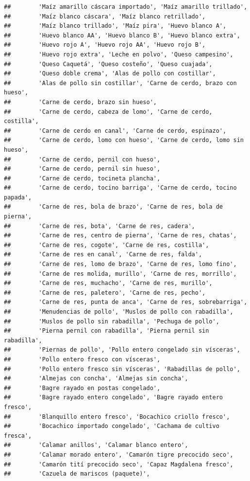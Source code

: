 \documentclass[
]{book}
\begin{document}
\begin{verbatim}
##        'Maíz amarillo cáscara importado', 'Maíz amarillo trillado',
##        'Maíz blanco cáscara', 'Maíz blanco retrillado',
##        'Maíz blanco trillado', 'Maíz pira', 'Huevo blanco A',
##        'Huevo blanco AA', 'Huevo blanco B', 'Huevo blanco extra',
##        'Huevo rojo A', 'Huevo rojo AA', 'Huevo rojo B',
##        'Huevo rojo extra', 'Leche en polvo', 'Queso campesino',
##        'Queso Caquetá', 'Queso costeño', 'Queso cuajada',
##        'Queso doble crema', 'Alas de pollo con costillar',
##        'Alas de pollo sin costillar', 'Carne de cerdo, brazo con hueso',
##        'Carne de cerdo, brazo sin hueso',
##        'Carne de cerdo, cabeza de lomo', 'Carne de cerdo, costilla',
##        'Carne de cerdo en canal', 'Carne de cerdo, espinazo',
##        'Carne de cerdo, lomo con hueso', 'Carne de cerdo, lomo sin hueso',
##        'Carne de cerdo, pernil con hueso',
##        'Carne de cerdo, pernil sin hueso',
##        'Carne de cerdo, tocineta plancha',
##        'Carne de cerdo, tocino barriga', 'Carne de cerdo, tocino papada',
##        'Carne de res, bola de brazo', 'Carne de res, bola de pierna',
##        'Carne de res, bota', 'Carne de res, cadera',
##        'Carne de res, centro de pierna', 'Carne de res, chatas',
##        'Carne de res, cogote', 'Carne de res, costilla',
##        'Carne de res en canal', 'Carne de res, falda',
##        'Carne de res, lomo de brazo', 'Carne de res, lomo fino',
##        'Carne de res molida, murillo', 'Carne de res, morrillo',
##        'Carne de res, muchacho', 'Carne de res, murillo',
##        'Carne de res, paletero', 'Carne de res, pecho',
##        'Carne de res, punta de anca', 'Carne de res, sobrebarriga',
##        'Menudencias de pollo', 'Muslos de pollo con rabadilla',
##        'Muslos de pollo sin rabadilla', 'Pechuga de pollo',
##        'Pierna pernil con rabadilla', 'Pierna pernil sin rabadilla',
##        'Piernas de pollo', 'Pollo entero congelado sin vísceras',
##        'Pollo entero fresco con vísceras',
##        'Pollo entero fresco sin vísceras', 'Rabadillas de pollo',
##        'Almejas con concha', 'Almejas sin concha',
##        'Bagre rayado en postas congelado',
##        'Bagre rayado entero congelado', 'Bagre rayado entero fresco',
##        'Blanquillo entero fresco', 'Bocachico criollo fresco',
##        'Bocachico importado congelado', 'Cachama de cultivo fresca',
##        'Calamar anillos', 'Calamar blanco entero',
##        'Calamar morado entero', 'Camarón tigre precocido seco',
##        'Camarón tití precocido seco', 'Capaz Magdalena fresco',
##        'Cazuela de mariscos (paquete)',

\end{verbatim}
\end{document}
